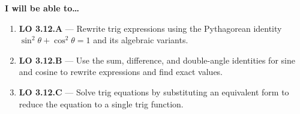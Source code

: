 \documentclass[10pt]{article}
\begin{document}
\namedateperiod

\vspace{0.10in}

\begin{objectivebox}
\textbf{I will be able to\ldots}
\begin{enumerate}[leftmargin=1.5em, itemsep=4pt]
  \item \textbf{LO 3.12.A} --- Rewrite trig expressions using the Pythagorean identity
    $\sin^2\theta + \cos^2\theta = 1$ and its algebraic variants.
  \item \textbf{LO 3.12.B} --- Use the sum, difference, and double-angle identities for
    sine and cosine to rewrite expressions and find exact values.
  \item \textbf{LO 3.12.C} --- Solve trig equations by substituting an equivalent form to
    reduce the equation to a single trig function.
\end{enumerate}
\end{objectivebox}

\vspace{0.08in}
\end{document}
